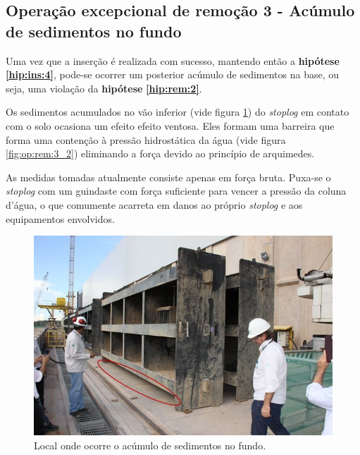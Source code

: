 \subsection{Operação excepcional de remoção 3 - Acúmulo de sedimentos no fundo}
\label{op:rem:3}
Uma vez que a inserção é realizada com sucesso, mantendo então a \textbf{hipótese}
\textbf{\ref{hip:ins:4}}, pode-se ocorrer um posterior acúmulo de sedimentos na
base, ou seja, uma violação da \textbf{hipótese} \textbf{\ref{hip:rem:2}}.

Os sedimentos acumulados no vão inferior (vide figura \ref{fig:op:rem:3_1}) do
\emph{stoplog} em contato com o solo ocasiona um efeito efeito ventosa. Eles
formam uma barreira que forma uma contenção à pressão hidrostática da água (vide
figura \ref{fig:op:rem:3_2})  eliminando a força devido ao princípio de
arquimedes.

As medidas tomadas atualmente consiste apenas em força bruta. Puxa-se o
\emph{stoplog} com um guindaste com força suficiente para vencer a pressão da
coluna d'água, o que comumente acarreta em danos ao próprio \emph{stoplog} e aos
equipamentos envolvidos.

\begin{figure}[h!]
    \centering
    \includegraphics[width=0.6\columnwidth]{figs/modos/op_rem_3/op_rem_3_1.jpg}
    \caption{Local onde ocorre o acúmulo de sedimentos no fundo.}
    \label{fig:op:rem:3_1}
\end{figure}


